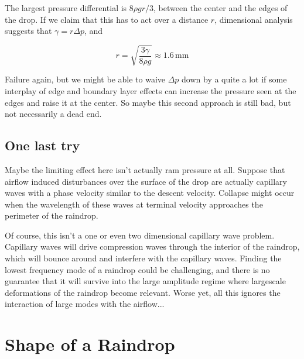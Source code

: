 \documentclass[12pt]{article}
\begin{document}
The largest pressure differential is \(8\rho gr/3\), between the center and the edges of the drop. If we claim that this has to act over a distance \(r\), dimensional analysis suggests that \(\gamma = r\Delta p \), and

\[ r = \sqrt{\frac{3\gamma}{8\rho g}} \approx 1.6\,\mathrm{mm}
\]

Failure again, but we might be able to waive \(\Delta p\) down by a quite a lot if some interplay of edge and boundary layer effects can increase the pressure seen at the edges and raise it at the center. So maybe this second approach is still bad, but not necessarily a dead end.

\subsection{One last try}

Maybe the limiting effect here isn't actually ram pressure at all. Suppose that airflow induced disturbances over the surface of the drop are actually capillary waves with a phase velocity similar to the descent velocity. Collapse might occur when the wavelength of these waves at terminal velocity approaches the perimeter of the raindrop.

Of course, this isn't a one or even two dimensional capillary wave problem. Capillary waves will drive compression waves through the interior of the raindrop, which will bounce around and interfere with the capillary waves. Finding the lowest frequency mode of a raindrop could be challenging, and there is no guarantee that it will survive into the large amplitude regime where largescale deformations of the raindrop become relevant. Worse yet, all this ignores the interaction of large modes with the airflow...

\section{Shape of a Raindrop}
\end{document}
